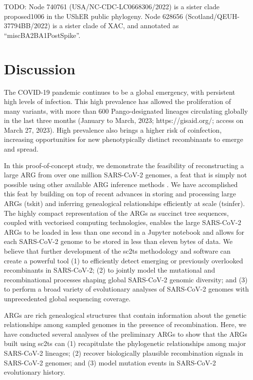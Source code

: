 \documentclass{article}
\begin{document}
TODO: Node  740761 (USA/NC-CDC-LC0668306/2022) is a sister clade proposed1006 in the UShER public phylogeny. Node 628656 (Scotland/QEUH-37794BB/2022) is a sister clade of XAC, and annotated as ``miscBA2BA1PostSpike''.

\section{Discussion}
The COVID-19 pandemic continues to be a global emergency, with persistent high levels of infection. This high prevalence has allowed the proliferation of many variants, with more than 600 Pango-designated lineages circulating globally in the last three months (January to March, 2023; https://gisaid.org/; access on March 27, 2023). High prevalence also brings a higher risk of coinfection, increasing opportunities for new phenotypically distinct recombinants to emerge and spread.

In this proof-of-concept study, we demonstrate the feasibility of reconstructing a large ARG from over one million SARS-CoV-2 genomes, a feat that is simply not possible using other available ARG inference methods \citep{Rasmussen2014-el,Ignatieva2021-rg, Speidel2019-yh}. We have accomplished this feat by building on top of recent advances in storing and processing large ARGs (tskit) and inferring genealogical relationships efficiently at scale (tsinfer). The highly compact representation of the ARGs as succinct tree sequences, coupled with vectorised computing technologies, enables the large SARS-CoV-2 ARGs to be loaded in less than one second in a Jupyter notebook and allows for each SARS-CoV-2 genome to be stored in less than eleven bytes of data. We believe that further development of the sc2ts methodology and software can create a powerful tool (1) to efficiently detect emerging or previously overlooked recombinants in SARS-CoV-2; (2) to jointly model the mutational and recombinational processes shaping global SARS-CoV-2 genomic diversity; and (3) to perform a broad variety of evolutionary analyses of SARS-CoV-2 genomes with unprecedented global sequencing coverage.

ARGs are rich genealogical structures that contain information about the genetic relationships among sampled genomes in the presence of recombination. Here, we have conducted several analyses of the preliminary ARGs to show that the ARGs built using sc2ts can (1) recapitulate the phylogenetic relationships among major SARS-CoV-2 lineages; (2) recover biologically plausible recombination signals in SARS-CoV-2 genomes; and (3) model mutation events in SARS-CoV-2 evolutionary history.
\end{document}
